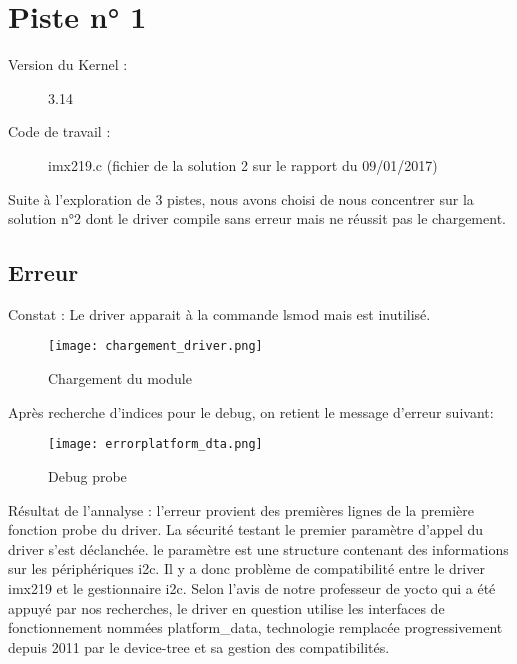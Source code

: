 \chapter{Piste n° 1} %
\label{Chapter2} %

\begin{description}
  \item[Version du Kernel :] 3.14
  \item[Code de travail :] imx219.c (fichier de la solution 2 sur le rapport du
  09/01/2017)
\end{description}

Suite à l'exploration de 3 pistes, nous avons choisi de nous
concentrer sur la solution n°2 dont le driver compile sans erreur mais ne
réussit pas le chargement.

\section{Erreur}
Constat : Le driver apparait à la commande lsmod mais est inutilisé.

 \begin{figure}[th]
   \centering
   \texttt{[image: chargement\_driver.png]}
   \decoRule
   \caption{Chargement du module}  \label{fig:planning}
\end{figure}

Après recherche d'indices pour le debug, on retient le message d'erreur suivant:
\begin{figure}[th]
  \centering
  \texttt{[image: errorplatform\_dta.png]}
  \decoRule
  \caption{Debug probe}  \label{fig:planning}
\end{figure}

Résultat de l'annalyse :
l'erreur provient des premières lignes de la première fonction probe du driver. La
sécurité testant le premier paramètre d'appel du driver s'est déclanchée. le
paramètre est une structure contenant des informations sur les périphériques i2c.
Il y a donc problème de compatibilité entre le driver imx219 et le gestionnaire i2c. Selon
l'avis de notre professeur de yocto qui a été appuyé par nos recherches,
le driver en question utilise les interfaces de fonctionnement nommées
platform\_data, technologie remplacée progressivement depuis 2011 par le
device-tree et sa gestion des compatibilités.

